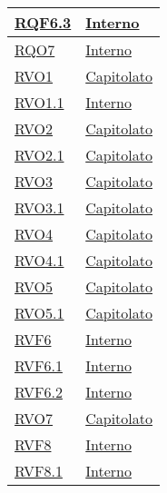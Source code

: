 \begin{longtable}{|>{\centering}m{5cm}|m{5cm}<{\centering}|}
\hyperlink{RQF6.3}{RQF6.3} & \hyperlink{Interno}{Interno}\\ \hline

\hyperlink{RQO7}{RQO7} & \hyperlink{Interno}{Interno}\\ \hline

\hyperlink{RVO1}{RVO1} & \hyperlink{Capitolato}{Capitolato}\\ \hline

\hyperlink{RVO1.1}{RVO1.1} & \hyperlink{Interno}{Interno}\\ \hline

\hyperlink{RVO2}{RVO2} & \hyperlink{Capitolato}{Capitolato}\\ \hline

\hyperlink{RVO2.1}{RVO2.1} & \hyperlink{Capitolato}{Capitolato}\\ \hline

\hyperlink{RVO3}{RVO3} & \hyperlink{Capitolato}{Capitolato}\\ \hline

\hyperlink{RVO3.1}{RVO3.1} & \hyperlink{Capitolato}{Capitolato}\\ \hline

\hyperlink{RVO4}{RVO4} & \hyperlink{Capitolato}{Capitolato}\\ \hline

\hyperlink{RVO4.1}{RVO4.1} & \hyperlink{Capitolato}{Capitolato}\\ \hline

\hyperlink{RVO5}{RVO5} & \hyperlink{Capitolato}{Capitolato}\\ \hline

\hyperlink{RVO5.1}{RVO5.1} & \hyperlink{Capitolato}{Capitolato}\\ \hline

\hyperlink{RVF6}{RVF6} & \hyperlink{Interno}{Interno}\\ \hline

\hyperlink{RVF6.1}{RVF6.1} & \hyperlink{Interno}{Interno}\\ \hline

\hyperlink{RVF6.2}{RVF6.2} & \hyperlink{Interno}{Interno}\\ \hline

\hyperlink{RVO7}{RVO7} & \hyperlink{Capitolato}{Capitolato}\\ \hline

\hyperlink{RVF8}{RVF8} & \hyperlink{Interno}{Interno}\\ \hline

\hyperlink{RVF8.1}{RVF8.1} & \hyperlink{Interno}{Interno}\\ \hline


\end{longtable}
